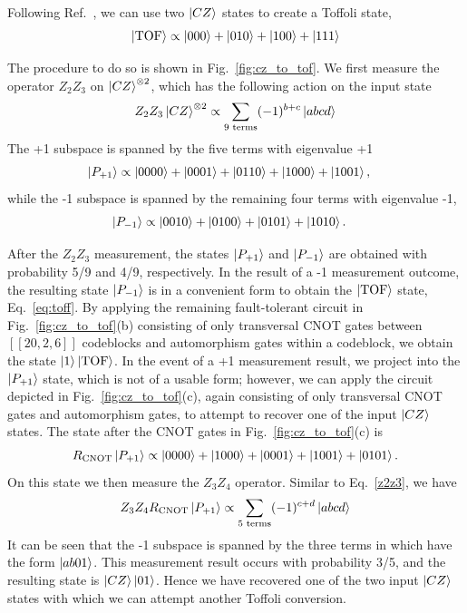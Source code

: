 Following Ref.~\cite{Gupta2024}, we can use two $\ket{CZ}$ states to create a Toffoli state,
\begin{equation}
    \ket{\rm TOF} \propto  \ket{000} + \ket{010} + \ket{100} + \ket{111}
    \label{eq:toff}
\end{equation}

The procedure to do so is shown in Fig.~\ref{fig:cz_to_tof}. 
We first measure the operator $Z_2Z_3$ on $\ket{CZ}^{\otimes 2}$, which has the following action on the input state
\begin{equation}
    Z_2Z_3\ket{CZ}^{\otimes 2} \propto \sum_{\text{9 terms}}(-1)^{b+c}\ket{abcd}
    \label{z2z3}
\end{equation}
The +1 subspace is spanned by the five terms with eigenvalue +1
\begin{align}
    \ket{P_{+1}} &\propto \ket{0000} + \ket{0001} + \ket{0110} + \ket{1000} + \ket{1001},
\end{align}
while the -1 subspace is spanned by the remaining four terms with eigenvalue -1,
\begin{align}
    \ket{P_{-1}} &\propto \ket{0010} + \ket{0100} + \ket{0101} + \ket{1010}.
\end{align}


After the $Z_2Z_3$ measurement, the states $\ket{P_{+1}}$ and $\ket{P_{-1}}$ are obtained with probability 5/9 and 4/9, respectively. In the result of a -1 measurement outcome, the resulting state $\ket{P_{-1}}$ is in a convenient form to obtain the $\ket{\rm TOF}$ state, Eq.~\eqref{eq:toff}. By applying the remaining fault-tolerant circuit in Fig.~\ref{fig:cz_to_tof}(b) consisting of only transversal CNOT gates between $[[20,2,6]]$ codeblocks and automorphism gates within a codeblock, we obtain the state $\ket{1}\ket{\rm TOF}$. In the event of a +1 measurement result, we project into the $\ket{P_{+1}}$ state, which is not of a usable form; however, we can apply the circuit depicted in Fig.~\ref{fig:cz_to_tof}(c), again consisting of only transversal CNOT gates and automorphism gates, to attempt to recover one of the input $\ket{CZ}$ states. The state after the CNOT gates in Fig.~\ref{fig:cz_to_tof}(c) is 
\begin{equation}
    R_{\rm CNOT}\ket{P_{+1}} \propto \ket{0000} + \ket{1000} + \ket{0001} + \ket{1001} + \ket{0101}.
    \label{eq:pre_recovery}
\end{equation}
On this state we then measure the $Z_3Z_4$ operator. Similar to Eq.~\eqref{z2z3}, we have
\begin{equation}
    Z_3Z_4 R_{\rm CNOT}\ket{P_{+1}} \propto \sum_{\text{5 terms}} (-1)^{c+d} \ket{abcd}
\end{equation}
It can be seen that the -1 subspace is spanned by the three terms in which have the form $\ket{ab01}$. This measurement result occurs with probability 3/5, and the resulting state is $\ket{CZ}\ket{01}$. Hence we have recovered one of the two input $\ket{CZ}$ states with which we can attempt another Toffoli conversion.

